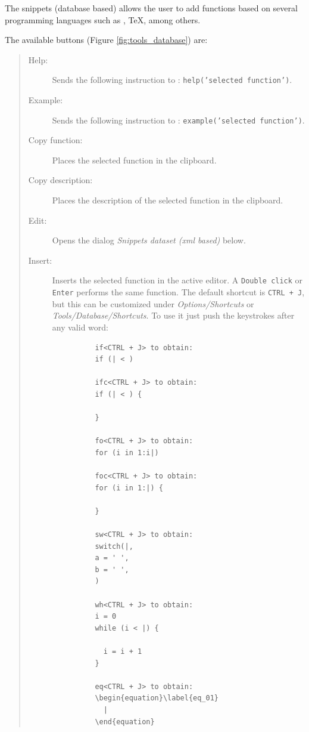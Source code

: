 The snippets (database based) allows the user to add functions based
on several programming languages such as \RR{}, \TeX, among others.

The available buttons
(Figure \ref{fig:tools_database})
are:

\begin{quote}
  \begin{footnotesize}
    \begin{description}
      \item[Help:]
        Sends the following instruction to \RR{}: \texttt{help('selected function')}.
      \item[Example:]
        Sends the following instruction to \RR{}:
        \texttt{example('selected function')}.
      \item[Copy function:]
        Places the selected function in the clipboard.
      \item[Copy description:]
        Places the description of the selected function in the clipboard.
      \item[Edit:]
        Opens the dialog \textit{Snippets dataset (xml based)} below.
      \item[Insert:]
        Inserts the selected function in the active editor. A \texttt{Double click}
        or \texttt{Enter} performs the same function.
        The default shortcut is \texttt{CTRL + J}, but this can be customized under
        \textit{Options/Shortcuts} or \textit{Tools/Database/Shortcuts}. To use
        it just push the keystrokes after any valid word:

        \begin{verbatim}
          if<CTRL + J> to obtain:
          if (| < )

          ifc<CTRL + J> to obtain:
          if (| < ) {

          }

          fo<CTRL + J> to obtain:
          for (i in 1:i|)

          foc<CTRL + J> to obtain:
          for (i in 1:|) {

          }

          sw<CTRL + J> to obtain:
          switch(|,
          a = ' ',
          b = ' ',
          )

          wh<CTRL + J> to obtain:
          i = 0
          while (i < |) {

            i = i + 1
          }

          eq<CTRL + J> to obtain:
          \begin{equation}\label{eq_01}
            |
          \end{equation}
        \end{verbatim}


\end{description}
\end{footnotesize}
\end{quote}
